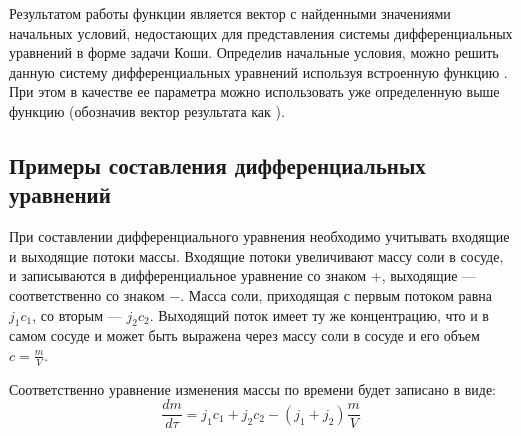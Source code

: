 Результатом работы функции  является вектор с найденными значениями начальных условий, недостающих для представления системы дифференциальных уравнений в форме задачи Коши. Определив начальные условия, можно решить данную систему дифференциальных уравнений используя встроенную функцию .  При этом  в качестве  ее параметра  можно использовать уже определенную выше функцию  (обозначив вектор результата как ).

 \subsection*{Примеры составления дифференциальных уравнений}
 
 При составлении дифференциального уравнения необходимо учитывать входящие и выходящие потоки массы. Входящие потоки увеличивают массу соли в сосуде, и записываются в дифференциальное уравнение со знаком +, выходящие --- соответственно со знаком $-$. Масса соли, приходящая с первым потоком равна $j_1 c_1$, со вторым --- $j_2 c_2$. Выходящий поток имеет ту же концентрацию, что и в самом сосуде и может быть выражена через массу соли в сосуде и его объем $c=\frac{m}{V}$.
 
 Соответственно уравнение изменения массы по времени будет записано в виде:
 \begin{equation}
 	\dfrac{d m}{d \tau} = j_1 c_1 + j_2 c_2 - (j_1 + j_2 ) \dfrac{m}{V}
 \end{equation}
 
 
 